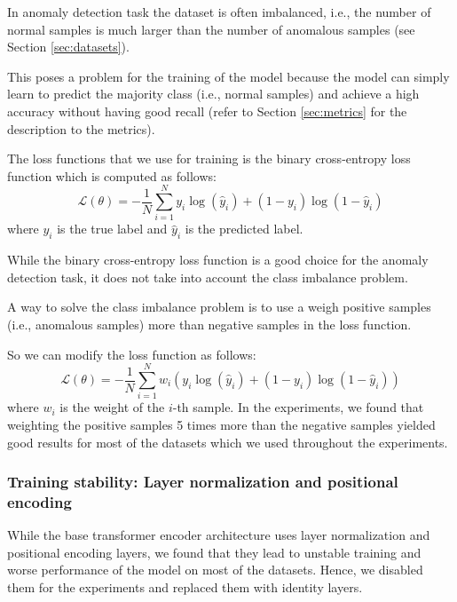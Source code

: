 \documentclass[a4paper, twoside]{report}
\theoremstyle{definition}
\numberwithin{equation}{section}
\begin{document}
In anomaly detection task the dataset is often imbalanced, i.e., the number of normal samples
is much larger than the number of anomalous samples (see Section \ref{sec:datasets}).

This poses a problem for the training of the model because the model can simply learn to predict
the majority class (i.e., normal samples) and achieve a high accuracy without having
good recall (refer to Section \ref{sec:metrics} for the description to the metrics).

The loss functions that we use for training is the binary cross-entropy loss function
\cite{Good_1952}
which is computed as follows:
\begin{equation} \label{eq:binary_cross_entropy}
    \mathcal{L}(\theta)=-\frac{1}{N} \sum_{i=1}^N y_i \log(\hat{y}_i) + (1-y_i) \log(1-\hat{y}_i)
\end{equation}
where $y_i$ is the true label and $\hat{y}_i$ is the predicted label.

While the binary cross-entropy loss function is a good choice for the anomaly detection task,
it does not take into account the class imbalance problem.

A way to solve the class imbalance problem is to use a weigh positive
samples (i.e., anomalous samples) more than negative samples in the loss function.

So we can modify the loss function as follows:
\begin{equation} \label{eq:weighted_binary_cross_entropy}
    \mathcal{L}(\theta)=-\frac{1}{N} \sum_{i=1}^N w_i (y_i \log(\hat{y}_i) + (1-y_i) \log(1-\hat{y}_i))
\end{equation}
where $w_i$ is the weight of the $i$-th sample.
In the experiments, we found that weighting the positive samples 5 times more than the negative samples
yielded good results for most of the datasets which we used throughout the experiments.

\subsubsection{Training stability: Layer normalization and positional encoding}

While the base transformer encoder architecture uses layer normalization and positional encoding layers,
we found that they lead to unstable training and worse performance of the model on most
of the datasets. Hence, we disabled them for the experiments and replaced them with
identity layers.
\end{document}
